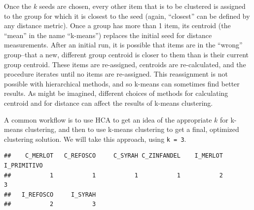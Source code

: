 \documentclass[
]{book}
\newenvironment{Shaded}{\begin{snugshade}}{\end{snugshade}}
\newcommand{\AttributeTok}[1]{\textcolor[rgb]{0.13,0.29,0.53}{#1}}
\newcommand{\DecValTok}[1]{\textcolor[rgb]{0.00,0.00,0.81}{#1}}
\newcommand{\FunctionTok}[1]{\textcolor[rgb]{0.13,0.29,0.53}{\textbf{#1}}}
\newcommand{\NormalTok}[1]{#1}
\newcommand{\OtherTok}[1]{\textcolor[rgb]{0.56,0.35,0.01}{#1}}
\newcommand{\SpecialCharTok}[1]{\textcolor[rgb]{0.81,0.36,0.00}{\textbf{#1}}}
\newcommand{\StringTok}[1]{\textcolor[rgb]{0.31,0.60,0.02}{#1}}
\begin{document}
Once the \(k\) seeds are chosen, every other item that is to be clustered is assigned to the group for which it is closest to the seed (again, ``closest'' can be defined by any distance metric). Once a group has more than 1 item, its centroid (the ``mean'' in the name ``k-means'') replaces the initial seed for distance measurements. After an initial run, it is possible that items are in the ``wrong'' group--that a new, different group centroid is closer to them than is their current group centroid. These items are re-assigned, centroids are re-calculated, and the procedure iterates until no items are re-assigned. This reassignment is not possible with hierarchical methods, and so k-means can sometimes find better results. As might be imagined, different choices of methods for calculating centroid and for distance can affect the results of k-means clustering.

A common workflow is to use HCA to get an idea of the appropriate \(k\) for k-means clustering, and then to use k-means clustering to get a final, optimized clustering solution. We will take this approach, using \texttt{k\ =\ 3}.

\begin{Shaded}
\end{Shaded}

\begin{verbatim}
##    C_MERLOT   C_REFOSCO     C_SYRAH C_ZINFANDEL    I_MERLOT I_PRIMITIVO 
##           1           1           1           1           2           3 
##   I_REFOSCO     I_SYRAH 
##           2           3
\end{verbatim}

\begin{Shaded}
\end{Shaded}
\end{document}
